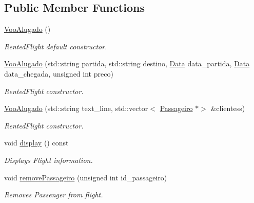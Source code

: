 \subsection*{Public Member Functions}
\begin{DoxyCompactItemize}
\item 
\mbox{\label{class_voo_alugado_a9cd24c055677e731d57033832a69f6aa}} 
\hyperlink{class_voo_alugado_a9cd24c055677e731d57033832a69f6aa}{Voo\+Alugado} ()
\begin{DoxyCompactList}\small\item\em Rented\+Flight default constructor. \end{DoxyCompactList}\item 
\hyperlink{class_voo_alugado_afb64b2d5ba50ff7394936f744693fb5c}{Voo\+Alugado} (std\+::string partida, std\+::string destino, \hyperlink{class_data}{Data} data\+\_\+partida, \hyperlink{class_data}{Data} data\+\_\+chegada, unsigned int preco)
\begin{DoxyCompactList}\small\item\em Rented\+Flight constructor. \end{DoxyCompactList}\item 
\hyperlink{class_voo_alugado_aefb2f2262a9f14753020d136d39800a4}{Voo\+Alugado} (std\+::string text\+\_\+line, std\+::vector$<$ \hyperlink{class_passageiro}{Passageiro} $\ast$$>$ \&clientess)
\begin{DoxyCompactList}\small\item\em Rented\+Flight constructor. \end{DoxyCompactList}\item 
\mbox{\label{class_voo_alugado_a040e655285228522082290b69a9cd413}} 
void \hyperlink{class_voo_alugado_a040e655285228522082290b69a9cd413}{display} () const
\begin{DoxyCompactList}\small\item\em Displays Flight information. \end{DoxyCompactList}\item 
void \hyperlink{class_voo_alugado_aaf46e034bb4655c62b432f9669a7ed65}{remove\+Passageiro} (unsigned int id\+\_\+passageiro)
\begin{DoxyCompactList}\small\item\em Removes Passenger from flight. \end{DoxyCompactList}\item 
\mbox{\label{class_voo_alugado_a6fba5571b65cb616c05643a2eee2cb69}} 
$$
\end{DoxyCompactItemize}
